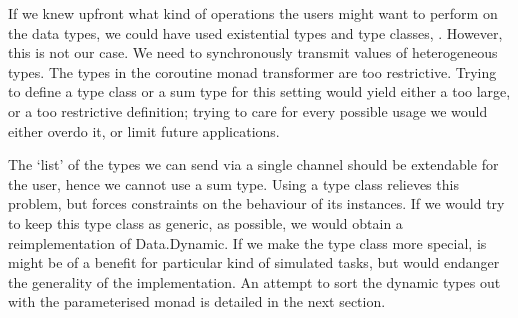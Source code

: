 


If we knew upfront what kind of operations the users might want to perform on the data types, we could have used existential types and type classes, \viz \cite{Laufer:1994:PTI:186025.186031,Kiselyov:2004:STH:1017472.1017488}.
However, this is not our case.
We need to synchronously transmit values of heterogeneous types.
The types in the coroutine monad transformer are too restrictive.
Trying to define a type class or a sum type for this setting would yield either a too large, or a too restrictive definition; trying to care for every possible usage we would either overdo it, or limit  future applications.

The `list' of the types we can send via a single channel should be extendable for the user, hence we cannot use a sum type.
Using a type class relieves this problem, but forces constraints on the behaviour of its instances.
If we would try to keep this type class as generic, as possible, we would obtain a reimplementation of \textsf{Data.Dynamic}.
If we make the type class more special, is might be of a benefit for particular kind of simulated tasks, but would endanger the generality of the implementation.
An attempt to sort the dynamic types out with the parameterised monad is detailed in the next section.

